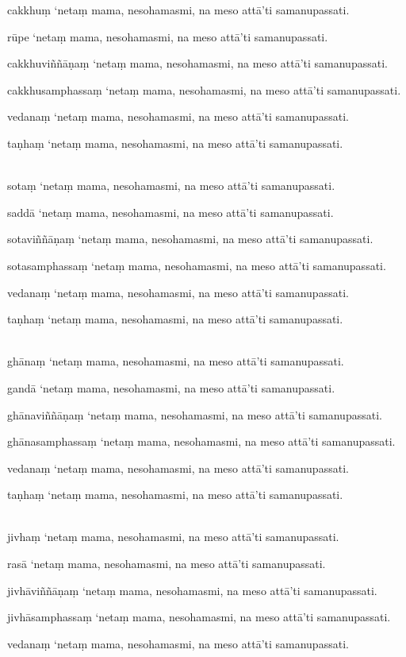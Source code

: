 \documentclass[9pt]{article}
\begin{document}
{\small{cakkhuṃ ‘netaṃ mama, nesohamasmi, na meso attā’ti samanupassati.\

rūpe ‘netaṃ mama, nesohamasmi, na meso attā’ti samanupassati.\

cakkhuviññāṇaṃ ‘netaṃ mama, nesohamasmi, na meso attā’ti samanupassati.\

cakkhusamphassaṃ ‘netaṃ mama, nesohamasmi, na meso attā’ti samanupassati.\

vedanaṃ ‘netaṃ mama, nesohamasmi, na meso attā’ti samanupassati.\

taṇhaṃ ‘netaṃ mama, nesohamasmi, na meso attā’ti samanupassati.\\\

sotaṃ ‘netaṃ mama, nesohamasmi, na meso attā’ti samanupassati.\

saddā ‘netaṃ mama, nesohamasmi, na meso attā’ti samanupassati.\

sotaviññāṇaṃ ‘netaṃ mama, nesohamasmi, na meso attā’ti samanupassati.\

sotasamphassaṃ ‘netaṃ mama, nesohamasmi, na meso attā’ti samanupassati.\

vedanaṃ ‘netaṃ mama, nesohamasmi, na meso attā’ti samanupassati.\

taṇhaṃ ‘netaṃ mama, nesohamasmi, na meso attā’ti samanupassati.\\\

ghānaṃ ‘netaṃ mama, nesohamasmi, na meso attā’ti samanupassati.\

gandā ‘netaṃ mama, nesohamasmi, na meso attā’ti samanupassati.\

ghānaviññāṇaṃ ‘netaṃ mama, nesohamasmi, na meso attā’ti samanupassati.\

ghānasamphassaṃ ‘netaṃ mama, nesohamasmi, na meso attā’ti samanupassati.\

vedanaṃ ‘netaṃ mama, nesohamasmi, na meso attā’ti samanupassati.\

taṇhaṃ ‘netaṃ mama, nesohamasmi, na meso attā’ti samanupassati.\\\

jivhaṃ ‘netaṃ mama, nesohamasmi, na meso attā’ti samanupassati.\

rasā ‘netaṃ mama, nesohamasmi, na meso attā’ti samanupassati.\

jivhāviññāṇaṃ ‘netaṃ mama, nesohamasmi, na meso attā’ti samanupassati.\

jivhāsamphassaṃ ‘netaṃ mama, nesohamasmi, na meso attā’ti samanupassati.\

vedanaṃ ‘netaṃ mama, nesohamasmi, na meso attā’ti samanupassati.\

}}
\end{document}

